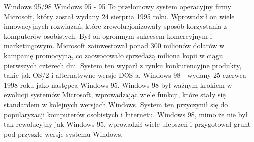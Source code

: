 \begin{frame}{Windows 95/98}
Windows 95 - 95 To przełomowy system operacyjny firmy Microsoft, który został wydany 24 sierpnia 1995 roku. Wprowadził on wiele innowacyjnych rozwiązań, które zrewolucjonizowały sposób korzystania z komputerów osobistych. Był on ogromnym sukcesem komercyjnym i marketingowym. Microsoft zainwestował ponad 300 milionów dolarów w kampanię promocyjną, co zaowocowało sprzedażą miliona kopii w ciągu pierwszych czterech dni. System ten wyparł z rynku konkurencyjne produkty, takie jak OS/2 i alternatywne wersje DOS-a. Windows 98 - wydany 25 czerwca 1998 roku jako następca Windows 95. Windows 98 był ważnym krokiem w ewolucji systemów Microsoft, wprowadzając wiele funkcji, które stały się standardem w kolejnych wersjach Windows. System ten przyczynił się do popularyzacji komputerów osobistych i Internetu. Windows 98, mimo że nie był tak rewolucyjny jak Windows 95, wprowadził wiele ulepszeń i przygotował grunt pod przyszłe wersje systemu Windows.

\end{frame}

